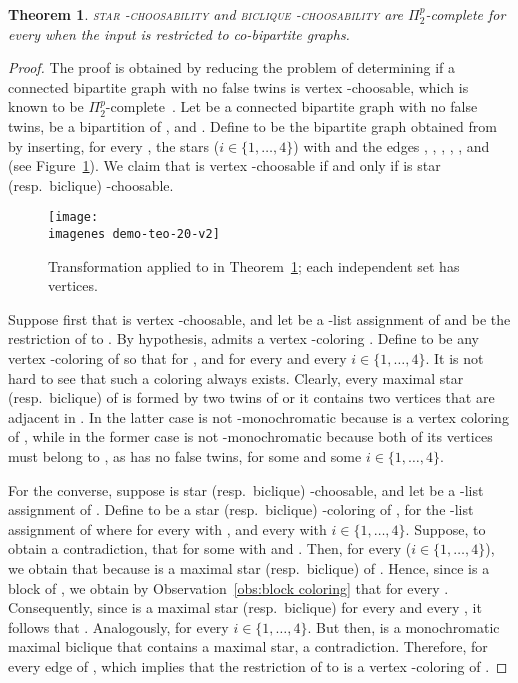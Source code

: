 \documentclass[a4paper, 11pt, oneside]{article}
\newtheorem{theorem}{Theorem}
\newcommand{\stchose}[1]{\textsc{star -choosability}}
\newcommand{\bcchose}[1]{\textsc{biclique -choosability}}
\newcommand{\ptwop}{\ensuremath{\Pi^p_2}\xspace}
\newcommand{\range}[3]{\ensuremath{#1 \in \{#2,\ldots,#3\}}}
\def\imagenes{}
\begin{document}
\begin{theorem}\label{thm:co-bipartite choosability}
 \stchose{k} and \bcchose{k} are \ptwop-complete for every  when the input is restricted to co-bipartite graphs.
\end{theorem}

\begin{proof}
 The proof is obtained by reducing the problem of determining if a connected bipartite graph with no false twins is vertex -choosable, which is known to be \ptwop-complete~\cite{GutnerTarsiDM2009}.  Let  be a connected bipartite graph with no false twins,  be a bipartition of , and .  Define  to be the bipartite graph obtained from  by inserting, for every , the stars  (\range{i}{1}{4}) with  and the edges , , , , , and  (see Figure~\ref{fig:co-bip choose}).  We claim that  is vertex -choosable if and only if  is star (resp.\ biclique) -choosable.  
 
\begin{figure}
  \centering\texttt{[image: \\imagenes demo-teo-20-v2]}\caption{Transformation applied to  in Theorem~\ref{thm:co-bipartite choosability}; each independent set has  vertices.}\label{fig:co-bip choose}
\end{figure}


 Suppose first that  is vertex -choosable, and let  be a -list assignment of  and  be the restriction of  to .  By hypothesis,  admits a vertex -coloring .  Define  to be any vertex -coloring of  so that  for , and  for every  and every \range{i}{1}{4}.  It is not hard to see that such a coloring always exists.  Clearly, every maximal star (resp.\ biclique)  of  is formed by two twins of  or it contains two vertices that are adjacent in .  In the latter case  is not -monochromatic because  is a vertex coloring of , while in the former case  is not -monochromatic because both of its vertices must belong to , as  has no false twins, for some  and some \range{i}{1}{4}.  
  
 For the converse, suppose  is star (resp.\ biclique) -choosable, and let  be a -list assignment of .  Define  to be a star (resp.\ biclique) -coloring of , for the -list assignment  of  where  for every  with , and every  with \range{i}{1}{4}.  Suppose, to obtain a contradiction, that  for some  with  and .  Then, for every  (\range{i}{1}{4}), we obtain that  because  is a maximal star (resp.\ biclique) of .  Hence, since  is a block of , we obtain by Observation~\ref{obs:block coloring} that  for every .  Consequently, since  is a maximal star (resp.\ biclique) for every  and every , it follows that .  Analogously,  for every \range{i}{1}{4}.  But then,  is a monochromatic maximal biclique that contains a maximal star, a contradiction.  Therefore,  for every edge  of , which implies that the restriction of  to  is a vertex -coloring of .
\end{proof}
\end{document}
